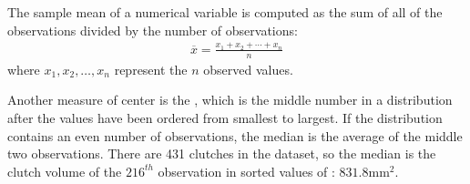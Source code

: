 \begin{doublespace}
\begin{termBox}{%
		The sample mean of a numerical variable is computed as the sum of all of the observations divided by the number of observations:
		\begin{eqnarray}
		\overline{x} = \frac{x_1+x_2+\cdots+x_n}{n}
		\label{meanEquation}
		\end{eqnarray}
		where $x_1, x_2, \dots, x_n$ represent the $n$ observed values.}
\end{termBox}\vspace{-2mm}

Another measure of center is the , which is the middle number in a distribution after the values have been ordered from smallest to largest. If the distribution contains an even number of observations, the median is the average of the middle two observations. There are 431 clutches in the dataset, so the median is the clutch volume of the $216^{th}$ observation in sorted values of : $831.8 \textrm{mm}^{2}$.

\end{doublespace}
